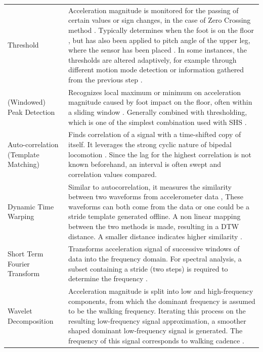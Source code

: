 	\begin{table}
	\centering
	\footnotesize
	\begin{tabularx}{\linewidth}{@{} P{17mm} L}
		\toprule
			&   	\\
		\midrule			
		Threshold & Acceleration magnitude is monitored for the passing of certain values or sign changes, in the case of Zero Crossing method \cite{Davidson2017,Harle2013}. Typically determines when the foot is on the floor \cite{Harle2013}, but has also been applied to pitch angle of the upper leg, where the sensor has been placed \cite{Diaz2014a}. In some instances, the thresholds are altered adaptively, for example through different motion mode detection or information gathered from the previous step \cite{Wu2019}.\\ 
		(Windowed) Peak Detection & Recognizes local maximum or minimum on acceleration magnitude caused by foot impact on the floor, often within a sliding window \cite{Susi2013}. Generally combined with thresholding, which is one of the simplest combination used with \ac{SHS} \cite{Davidson2017}. \\ \hline
		Auto-correlation (Template Matching) &  Finds correlation of a signal with a time-shifted copy of itself. It leverages the strong cyclic nature of bipedal locomotion \cite{Harle2013}. Since the lag for the highest correlation is not known beforehand, an interval is often swept and correlation values compared. \\ \hline
		Dynamic Time Warping & Similar to autocorrelation, it measures the similarity between two waveforms from accelerometer data \cite{Davidson2017}, These waveforms can both come from the data or one could be a stride template generated offline. A non linear mapping between the two methods is made, resulting in a DTW distance. A smaller distance indicates higher similarity \cite{Davidson2017}.  \\ \hline
		Short Term Fourier Transform & Transforms acceleration signal of successive windows of data into the frequency domain. For spectral analysis, a subset containing a stride (two steps) is required to determine the frequency \cite{Harle2013}.  \\ \hline
		Wavelet Decomposition & Acceleration magnitude is split into low and high-frequency components, from which the dominant frequency is assumed to be the walking frequency. Iterating this process on the resulting low-frequency signal approximation, a smoother shaped dominant low-frequency signal is generated. The frequency of this signal corresponds to walking cadence \cite{Davidson2017}. \\ \hline	

\end{tabularx}
\end{table}
